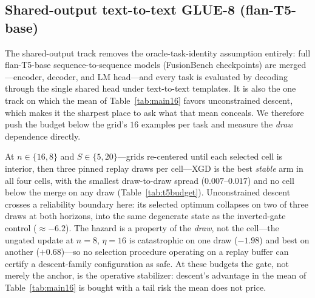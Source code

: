 \documentclass{article} %
\begin{document}
\iffalse
\subsection{Shared-output text-to-text GLUE-8 (flan-T5-base)}
\label{sec:t5}
The shared-output track removes the oracle-task-identity assumption entirely: full flan-T5-base sequence-to-sequence models (FusionBench checkpoints) are merged---encoder, decoder, and LM head---and every task is evaluated by decoding through the single shared head under text-to-text templates. It is also the one track on which the mean of Table~\ref{tab:main16} favors unconstrained descent, which makes it the sharpest place to ask what that mean conceals. We therefore push the budget below the grid's $16$ examples per task and measure the \emph{draw} dependence directly.

At $n\in\{16,8\}$ and $S\in\{5,20\}$---grids re-centered until each selected cell is interior, then three pinned replay draws per cell---XGD is the best \emph{stable} arm in all four cells, with the smallest draw-to-draw spread ($0.007$--$0.017$) and no cell below the merge on any draw (Table~\ref{tab:t5budget}). Unconstrained descent crosses a reliability boundary here: its selected optimum collapses on two of three draws at both horizons, into the same degenerate state as the inverted-gate control (${\approx}{-}6.2$). The hazard is a property of the \emph{draw}, not the cell---the ungated update at $n=8$, $\eta=16$ is catastrophic on one draw ($-1.98$) and best on another ($+0.68$)---so no selection procedure operating on a replay buffer can certify a descent-family configuration as safe. At these budgets the gate, not merely the anchor, is the operative stabilizer: descent's advantage in the mean of Table~\ref{tab:main16} is bought with a tail risk the mean does not price.
\end{document}
